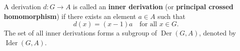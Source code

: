 A derivation $d : G \to A$ is called an \textbf{inner derivation} (or \textbf{principal crossed homomorphism}) if there exists an element $a \in A$ such that
$$d(x) = (x-1)a \quad \text{for all } x \in G.$$
The set of all inner derivations forms a subgroup of $\operatorname{Der}(G, A)$, denoted by $\operatorname{Ider}(G, A)$.
